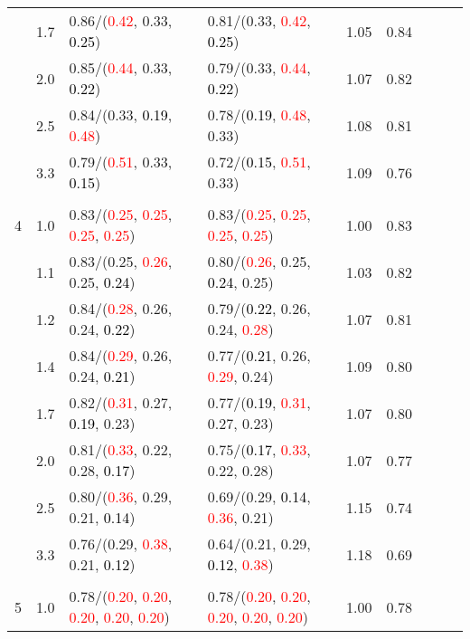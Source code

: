 \documentclass[10pt,a4paper]{report}
\begin{document}
\begin{table}[!htbp]
\begin{center}
{\begin{tabular}{ccllccccc}
			&1.7&0.86/(\textcolor{red}{0.42}, 0.33, \textcolor{black}{0.25})&0.81/(0.33, \textcolor{red}{0.42}, \textcolor{black}{0.25})&1.05&0.84\\
			&2.0&0.85/(\textcolor{red}{0.44}, 0.33, \textcolor{black}{0.22})&0.79/(0.33, \textcolor{red}{0.44}, \textcolor{black}{0.22})&1.07&0.82\\
			&2.5&0.84/(0.33, \textcolor{black}{0.19}, \textcolor{red}{0.48})&0.78/(\textcolor{black}{0.19}, \textcolor{red}{0.48}, 0.33)&1.08&0.81\\
			&3.3&0.79/(\textcolor{red}{0.51}, 0.33, \textcolor{black}{0.15})&0.72/(\textcolor{black}{0.15}, \textcolor{red}{0.51}, 0.33)&1.09&0.76\\
			&&&&\\
			4			&1.0&0.83/(\textcolor{red}{0.25}, \textcolor{red}{0.25}, \textcolor{red}{0.25}, \textcolor{red}{0.25})&0.83/(\textcolor{red}{0.25}, \textcolor{red}{0.25}, \textcolor{red}{0.25}, \textcolor{red}{0.25})&1.00&0.83\\
			&1.1&0.83/(0.25, \textcolor{red}{0.26}, 0.25, \textcolor{black}{0.24})&0.80/(\textcolor{red}{0.26}, 0.25, \textcolor{black}{0.24}, 0.25)&1.03&0.82\\
			&1.2&0.84/(\textcolor{red}{0.28}, 0.26, 0.24, \textcolor{black}{0.22})&0.79/(\textcolor{black}{0.22}, 0.26, 0.24, \textcolor{red}{0.28})&1.07&0.81\\
			&1.4&0.84/(\textcolor{red}{0.29}, 0.26, 0.24, \textcolor{black}{0.21})&0.77/(\textcolor{black}{0.21}, 0.26, \textcolor{red}{0.29}, 0.24)&1.09&0.80\\
			&1.7&0.82/(\textcolor{red}{0.31}, 0.27, \textcolor{black}{0.19}, 0.23)&0.77/(\textcolor{black}{0.19}, \textcolor{red}{0.31}, 0.27, 0.23)&1.07&0.80\\
			&2.0&0.81/(\textcolor{red}{0.33}, 0.22, 0.28, \textcolor{black}{0.17})&0.75/(\textcolor{black}{0.17}, \textcolor{red}{0.33}, 0.22, 0.28)&1.07&0.77\\
			&2.5&0.80/(\textcolor{red}{0.36}, 0.29, 0.21, \textcolor{black}{0.14})&0.69/(0.29, \textcolor{black}{0.14}, \textcolor{red}{0.36}, 0.21)&1.15&0.74\\
			&3.3&0.76/(0.29, \textcolor{red}{0.38}, 0.21, \textcolor{black}{0.12})&0.64/(0.21, 0.29, \textcolor{black}{0.12}, \textcolor{red}{0.38})&1.18&0.69\\
			&&&&\\
			5			&1.0&0.78/(\textcolor{red}{0.20}, \textcolor{red}{0.20}, \textcolor{red}{0.20}, \textcolor{red}{0.20}, \textcolor{red}{0.20})&0.78/(\textcolor{red}{0.20}, \textcolor{red}{0.20}, \textcolor{red}{0.20}, \textcolor{red}{0.20}, \textcolor{red}{0.20})&1.00&0.78\\

\end{tabular}}
\end{center}
\end{table}
\end{document}
